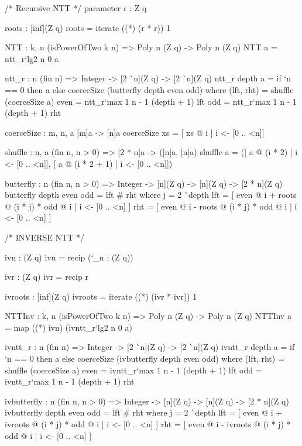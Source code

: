 \begin{code}
  /* Recursive NTT */
  parameter
    r : Z q

  roots : [inf](Z q)
  roots = iterate ((*) (r * r)) 1
  
  NTT : {k, n} (isPowerOfTwo k n) => Poly n (Z q) -> Poly n (Z q)
  NTT a = ntt_r`{lg2 n} 0 a

  ntt_r : {n} (fin n) =>
    Integer -> [2 ^^ n](Z q) -> [2 ^^ n](Z q)
  ntt_r depth a =
    if `n == 0 then
      a
    else
      coerceSize (butterfly depth even odd)
      where
        (lft, rht) = shuffle (coerceSize a)
        even = ntt_r`{max 1 n - 1} (depth + 1) lft
        odd = ntt_r`{max 1 n - 1} (depth + 1) rht

  coerceSize : {m, n, a} [m]a -> [n]a
  coerceSize xs = [ xs @ i | i <- [0 .. <n]]

  shuffle : {n, a} (fin n, n > 0) => [2 * n]a -> ([n]a, [n]a)
  shuffle a =
    ([ a @ (i * 2) | i <- [0 .. <n]], [ a @ (i * 2 + 1) | i <- [0 .. <n]])

  butterfly : {n} (fin n, n > 0) =>
    Integer -> [n](Z q) -> [n](Z q) -> [2 * n](Z q)
  butterfly depth even odd =
    lft # rht
    where
      j = 2 ^^ depth
      lft = [ even @ i + roots @ (i * j) * odd @ i | i <- [0 .. <n] ]
      rht = [ even @ i - roots @ (i * j) * odd @ i | i <- [0 .. <n] ]
\end{code}

\begin{code}
  /* INVERSE NTT */

  ivn : (Z q)
  ivn = recip (`_n : (Z q))

  ivr : (Z q)
  ivr = recip r

  ivroots : [inf](Z q)
  ivroots = iterate ((*) (ivr * ivr)) 1

  NTTInv : {k, n} (isPowerOfTwo k n) => Poly n (Z q) -> Poly n (Z q)
  NTTInv a =
    map ((*) ivn) (ivntt_r`{lg2 n} 0 a)

  ivntt_r : {n} (fin n) => Integer -> [2 ^^ n](Z q) -> [2 ^^ n](Z q)
  ivntt_r depth a =
    if `n == 0 then
      a
    else
      coerceSize (ivbutterfly depth even odd)
      where
        (lft, rht) = shuffle (coerceSize a)
        even = ivntt_r`{max 1 n - 1} (depth + 1) lft
        odd = ivntt_r`{max 1 n - 1} (depth + 1) rht

  ivbutterfly : {n} (fin n, n > 0) =>
    Integer -> [n](Z q) -> [n](Z q) -> [2 * n](Z q)
  ivbutterfly depth even odd =
    lft # rht
    where
      j = 2 ^^ depth
      lft = [ even @ i + ivroots @ (i * j) * odd @ i | i <- [0 .. <n] ]
      rht = [ even @ i - ivroots @ (i * j) * odd @ i | i <- [0 .. <n] ]
\end{code}

